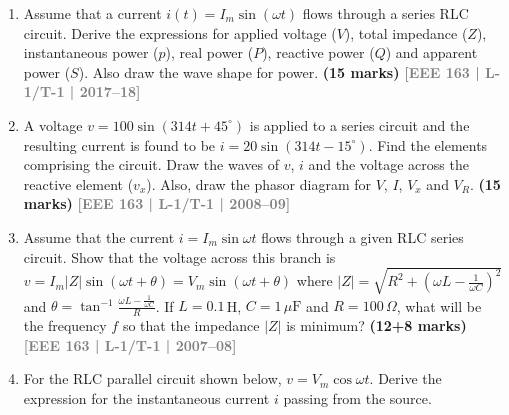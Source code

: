 \documentclass[12pt,a3paper]{article}
\newcommand{\yr}[1]{\hfill\textcolor{gray}{\small\textbf{[#1]}}}
\newcommand{\mk}[1]{\textcolor{orange!70!black}{\small\textbf{(#1 marks)}}}
\begin{document}
\begin{enumerate}
\begin{center}

\end{center}
\mk{15} \yr{EEE 163 | L-1/T-1 | 2020--21}

\item Assume that a current $i(t) = I_m\sin(\omega t)$ flows through a series RLC circuit. Derive the expressions for applied voltage ($V$), total impedance ($Z$), instantaneous power ($p$), real power ($P$), reactive power ($Q$) and apparent power ($S$). Also draw the wave shape for power.
\mk{15} \yr{EEE 163 | L-1/T-1 | 2017--18}

\item A voltage $v = 100\sin(314t + 45^\circ)$ is applied to a series circuit and the resulting current is found to be $i = 20\sin(314t - 15^\circ)$. Find the elements comprising the circuit. Draw the waves of $v$, $i$ and the voltage across the reactive element ($v_x$). Also, draw the phasor diagram for $V$, $I$, $V_x$ and $V_R$.
\mk{15} \yr{EEE 163 | L-1/T-1 | 2008--09}

\item Assume that the current $i = I_m\sin\omega t$ flows through a given RLC series circuit. Show that the voltage across this branch is $v = I_m|Z|\sin(\omega t+\theta) = V_m\sin(\omega t+\theta)$ where $|Z| = \sqrt{R^2+(\omega L - \frac{1}{\omega C})^2}$ and $\theta = \tan^{-1}\frac{\omega L - \frac{1}{\omega C}}{R}$. If $L = 0.1$\,H, $C = 1\,\mu\text{F}$ and $R = 100\,\Omega$, what will be the frequency $f$ so that the impedance $|Z|$ is minimum?
\mk{12+8} \yr{EEE 163 | L-1/T-1 | 2007--08}

\item For the RLC parallel circuit shown below, $v = V_m \cos\omega t$. Derive the expression for the instantaneous current $i$ passing from the source.
\begin{center}
\end{center}
\end{enumerate}
\end{document}
